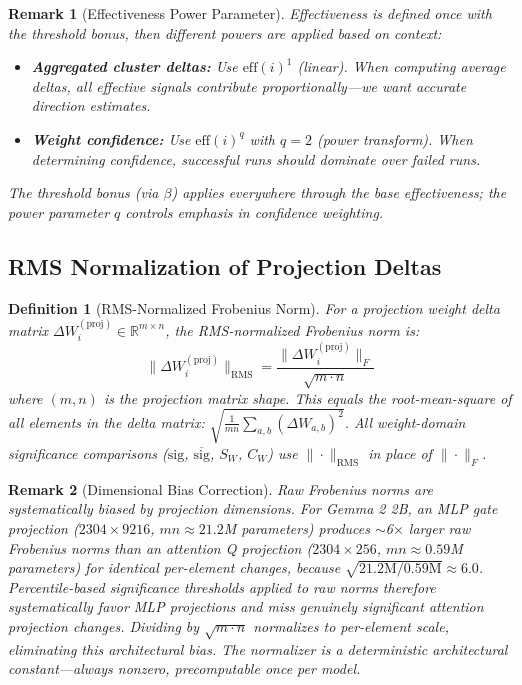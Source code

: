 \documentclass[11pt]{article}
\newtheorem{definition}{Definition}[section]
\newtheorem{remark}{Remark}[section]
\begin{document}
\begin{remark}[Effectiveness Power Parameter]
\label{rem:effectiveness-power-parameter}
Effectiveness is defined once with the threshold bonus, then different powers are applied based on context:
\begin{itemize}[nosep]
\item \textbf{Aggregated cluster deltas:} Use $\text{eff}(i)^1$ (linear). When computing average deltas, all effective signals contribute proportionally---we want accurate direction estimates.
\item \textbf{Weight confidence:} Use $\text{eff}(i)^q$ with $q=2$ (power transform). When determining confidence, successful runs should dominate over failed runs.
\end{itemize}
The threshold bonus (via $\beta$) applies everywhere through the base effectiveness; the power parameter $q$ controls emphasis in confidence weighting.
\end{remark}

\subsection{RMS Normalization of Projection Deltas}
\label{sec:rms-normalization}

\begin{definition}[RMS-Normalized Frobenius Norm]
\label{def:rms-norm}
For a projection weight delta matrix $\Delta W_i^{(\text{proj})} \in \mathbb{R}^{m \times n}$, the RMS-normalized Frobenius norm is:
\begin{equation}
\|\Delta W_i^{(\text{proj})}\|_{\text{RMS}} = \frac{\|\Delta W_i^{(\text{proj})}\|_F}{\sqrt{m \cdot n}}
\end{equation}
where $(m, n)$ is the projection matrix shape. This equals the root-mean-square of all elements in the delta matrix: $\sqrt{\frac{1}{mn}\sum_{a,b}(\Delta W_{a,b})^2}$. All weight-domain significance comparisons ($\text{sig}$, $\overline{\text{sig}}$, $S_W$, $C_W$) use $\|\cdot\|_{\text{RMS}}$ in place of $\|\cdot\|_F$.
\end{definition}

\begin{remark}[Dimensional Bias Correction]
\label{rem:dimensional-bias-correction}
Raw Frobenius norms are systematically biased by projection dimensions. For Gemma 2 2B, an MLP gate projection ($2304 \times 9216$, $mn \approx 21.2$M parameters) produces $\sim$6$\times$ larger raw Frobenius norms than an attention Q projection ($2304 \times 256$, $mn \approx 0.59$M parameters) for identical per-element changes, because $\sqrt{21.2\text{M} / 0.59\text{M}} \approx 6.0$. Percentile-based significance thresholds applied to raw norms therefore systematically favor MLP projections and miss genuinely significant attention projection changes. Dividing by $\sqrt{m \cdot n}$ normalizes to per-element scale, eliminating this architectural bias. The normalizer is a deterministic architectural constant---always nonzero, precomputable once per model.
\end{remark}
\end{document}
